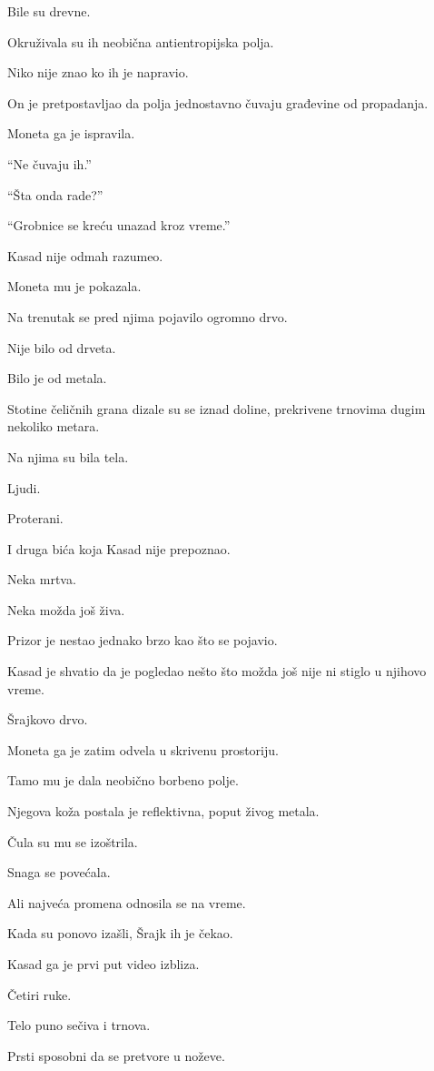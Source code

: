 Bile su drevne.

Okruživala su ih neobična antientropijska polja.

Niko nije znao ko ih je napravio.

On je pretpostavljao da polja jednostavno čuvaju građevine od propadanja.

Moneta ga je ispravila.

``Ne čuvaju ih.''

``Šta onda rade?''

``Grobnice se kreću unazad kroz vreme.''

Kasad nije odmah razumeo.

Moneta mu je pokazala.

Na trenutak se pred njima pojavilo ogromno drvo.

Nije bilo od drveta.

Bilo je od metala.

Stotine čeličnih grana dizale su se iznad doline, prekrivene trnovima dugim nekoliko metara.

Na njima su bila tela.

Ljudi.

Proterani.

I druga bića koja Kasad nije prepoznao.

Neka mrtva.

Neka možda još živa.

Prizor je nestao jednako brzo kao što se pojavio.

Kasad je shvatio da je pogledao nešto što možda još nije ni stiglo u njihovo vreme.

Šrajkovo drvo.

\bigskip

Moneta ga je zatim odvela u skrivenu prostoriju.

Tamo mu je dala neobično borbeno polje.

Njegova koža postala je reflektivna, poput živog metala.

Čula su mu se izoštrila.

Snaga se povećala.

Ali najveća promena odnosila se na vreme.

Kada su ponovo izašli, Šrajk ih je čekao.

Kasad ga je prvi put video izbliza.

Četiri ruke.

Telo puno sečiva i trnova.

Prsti sposobni da se pretvore u noževe.

